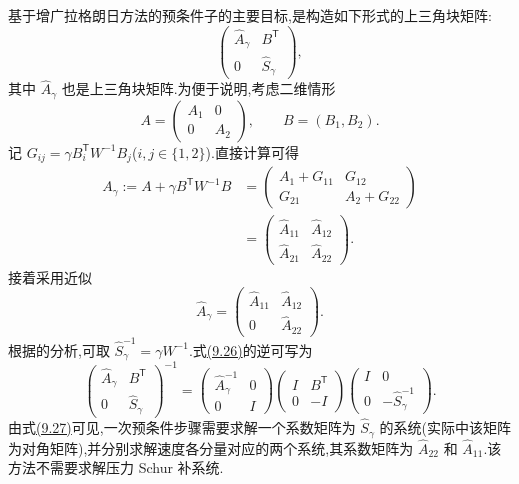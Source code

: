 \begin{note}[基于增广拉格朗日方法的预条件子]
基于增广拉格朗日方法的预条件子的主要目标,是构造如下形式的上三角块矩阵:
\begin{equation}\label{eq:chapter9-augmented-lagrangian-preconditioner}
\begin{pmatrix}\widehat A_\gamma&B^{\mathsf T}\\0&\widehat S_\gamma\end{pmatrix},
\end{equation}
其中 $\widehat A_\gamma$ 也是上三角块矩阵.为便于说明,考虑二维情形
\[
A=\begin{pmatrix}A_1&0\\0&A_2\end{pmatrix},
\qquad B=(B_1,B_2).
\]
记 $G_{ij}=\gamma B_i^{\mathsf T}W^{-1}B_j$($i,j\in\{1,2\}$).直接计算可得
\[
\begin{aligned}
A_\gamma:=A+\gamma B^{\mathsf T}W^{-1}B
&=\begin{pmatrix}
A_1+G_{11}&G_{12}\\
G_{21}&A_2+G_{22}
\end{pmatrix}\\
&=\begin{pmatrix}\widehat A_{11}&\widehat A_{12}\\
\widehat A_{21}&\widehat A_{22}\end{pmatrix}.
\end{aligned}
\]
接着采用近似
\[
\widehat A_\gamma=
\begin{pmatrix}\widehat A_{11}&\widehat A_{12}\\0&\widehat A_{22}\end{pmatrix}.
\]
根据\textcite{BenziWang2011}的分析,可取 $\widehat S_\gamma^{-1}=\gamma W^{-1}$.式\hyperref[eq:chapter9-augmented-lagrangian-preconditioner]{(9.26)}的逆可写为
\begin{equation}\label{eq:chapter9-augmented-lagrangian-inverse}
\begin{pmatrix}\widehat A_\gamma&B^{\mathsf T}\\0&\widehat S_\gamma\end{pmatrix}^{-1}
=
\begin{pmatrix}\widehat A_\gamma^{-1}&0\\0&I\end{pmatrix}
\begin{pmatrix}I&B^{\mathsf T}\\0&-I\end{pmatrix}
\begin{pmatrix}I&0\\0&-\widehat S_\gamma^{-1}\end{pmatrix}.
\end{equation}
由式\hyperref[eq:chapter9-augmented-lagrangian-inverse]{(9.27)}可见,一次预条件步骤需要求解一个系数矩阵为 $\widehat S_\gamma$ 的系统(实际中该矩阵为对角矩阵),并分别求解速度各分量对应的两个系统,其系数矩阵为 $\widehat A_{22}$ 和 $\widehat A_{11}$.该方法不需要求解压力 Schur 补系统.


\end{note}
